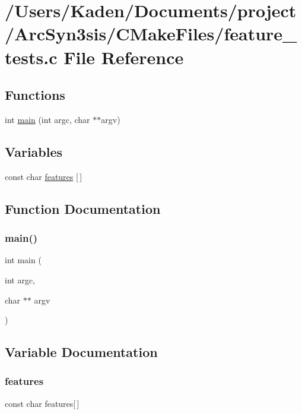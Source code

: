 \hypertarget{a00819}{}\section{/\+Users/\+Kaden/\+Documents/project/\+Arc\+Syn3sis/\+C\+Make\+Files/feature\+\_\+tests.c File Reference}
\label{a00819}
\subsection*{Functions}
\begin{DoxyCompactItemize}
\item 
int \hyperlink{a00819_a3c04138a5bfe5d72780bb7e82a18e627}{main} (int argc, char $\ast$$\ast$argv)
\end{DoxyCompactItemize}
\subsection*{Variables}
\begin{DoxyCompactItemize}
\item 
const char \hyperlink{a00819_a1582568e32f689337602a16bf8a5bff0}{features} \mbox{[}$\,$\mbox{]}
\end{DoxyCompactItemize}


\subsection{Function Documentation}
\mbox{\label{a00819_a3c04138a5bfe5d72780bb7e82a18e627}} 
\subsubsection{\texorpdfstring{main()}{main()}}
{\footnotesize\ttfamily int main (\begin{DoxyParamCaption}\item[{int}]{argc,  }\item[{char $\ast$$\ast$}]{argv }\end{DoxyParamCaption})}



\subsection{Variable Documentation}
\mbox{\label{a00819_a1582568e32f689337602a16bf8a5bff0}} 
\subsubsection{\texorpdfstring{features}{features}}
{\footnotesize\ttfamily const char features\mbox{[}$\,$\mbox{]}}

